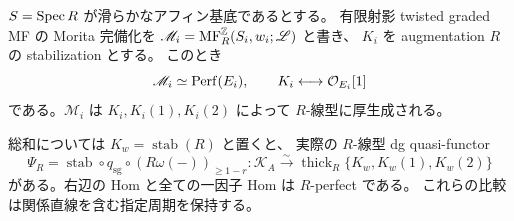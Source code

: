 \begin{lemma}
\label{mbrn:lem:window}
$S=\operatorname{Spec} R$ が滑らかなアフィン基底であるとする。
有限射影 twisted graded MF の Morita 完備化を
$\mathscr M_i=\operatorname{MF}^{\mathbb Z}_R(S_i,w_i;\mathscr L)$ と書き、
$K_i$ を augmentation $R$ の stabilization とする。
このとき
\begin{equation}\label{mbrn:eq:factor-window}
 \mathscr M_i\simeq\operatorname{Perf}(E_i),\qquad
 K_i\longleftrightarrow\mathcal O_{E_i}[1]
\end{equation}
である。$\mathscr M_i$ は $K_i,K_i(1),K_i(2)$ によって $R$-線型に厚生成される。

総和については $K_w=\operatorname{stab}(R)$ と置くと、
実際の $R$-線型 dg quasi-functor
\begin{equation}\label{mbrn:eq:total-window}
 \Psi_R=\operatorname{stab}\circ q_{\mathrm{sg}}
                          \circ(R\omega(-))_{\geq1-r}
 :\mathscr K_A\xrightarrow{\sim}
       \operatorname{thick}_R\{K_w,K_w(1),K_w(2)\}
\end{equation}
がある。右辺の Hom と全ての一因子 Hom は $R$-perfect である。
これらの比較は関係直線を含む指定周期を保持する。
\end{lemma}
